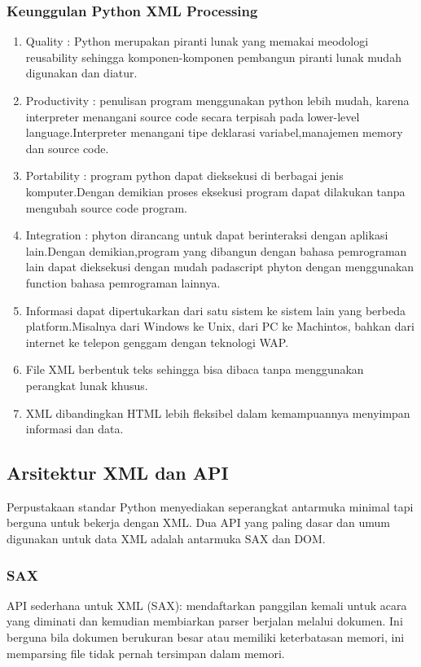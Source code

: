 \subsubsection{Keunggulan Python XML Processing}
\begin{enumerate}
Keunggulan dari python dapat dijabarkan dari faktor-faktor berikut ini :
\item Quality : Python merupakan piranti lunak yang memakai meodologi reusability sehingga komponen-komponen pembangun piranti      lunak mudah digunakan dan diatur.
\item Productivity : penulisan program menggunakan python lebih mudah, karena interpreter menangani source code secara terpisah pada lower-level language.Interpreter menangani tipe deklarasi variabel,manajemen memory dan source code.
\item Portability : program python dapat dieksekusi di berbagai jenis komputer.Dengan demikian proses eksekusi program dapat dilakukan tanpa mengubah source code program.
\item Integration : phyton dirancang untuk dapat berinteraksi dengan aplikasi lain.Dengan demikian,program yang dibangun dengan bahasa pemrograman lain dapat dieksekusi dengan mudah padascript phyton dengan menggunakan function bahasa pemrograman lainnya.
\item Informasi dapat dipertukarkan dari satu sistem ke sistem lain yang berbeda platform.Misalnya dari Windows ke Unix, dari PC ke Machintos, bahkan dari internet ke telepon genggam dengan teknologi WAP.
\item File XML berbentuk teks sehingga bisa dibaca tanpa menggunakan perangkat lunak khusus.
\item XML dibandingkan HTML lebih fleksibel dalam kemampuannya menyimpan informasi dan data.
\end{enumerate}
 
\subsection {Arsitektur XML dan API}
  Perpustakaan standar Python menyediakan seperangkat antarmuka minimal tapi berguna untuk bekerja dengan XML. Dua API yang paling dasar dan umum digunakan untuk data XML adalah antarmuka SAX dan DOM. 
\subsubsection {SAX}
  API sederhana untuk XML (SAX): mendaftarkan panggilan kemali untuk acara yang diminati dan kemudian membiarkan parser berjalan melalui dokumen. Ini berguna bila dokumen berukuran besar atau memiliki keterbatasan memori, ini memparsing file tidak pernah tersimpan dalam memori.
